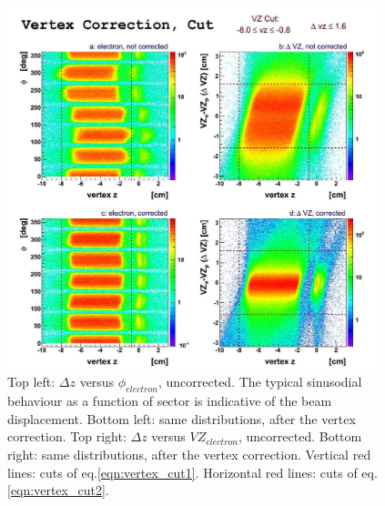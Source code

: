 \begin{figure}[h]
	\centering
		\includegraphics[width=0.96\textwidth ]{img/vtx_2D_all_sector.jpg}
			\caption{Top left: $\Delta z$ versus $\phi_{electron}$, uncorrected.
						The typical sinusodial behaviour as a function of sector is
						indicative of the beam displacement. Bottom left: same 
						distributions, after the vertex correction. 
						Top right:  $\Delta z$ versus $VZ_{electron}$, uncorrected. Bottom
						right: same distributions, after the vertex correction.
						Vertical red lines: cuts of eq.\ref{eqn:vertex_cut1}.
						Horizontal red lines: cuts of eq.\ref{eqn:vertex_cut2}.}
			\label{fig:vertex_corr_2D}
\end{figure}










